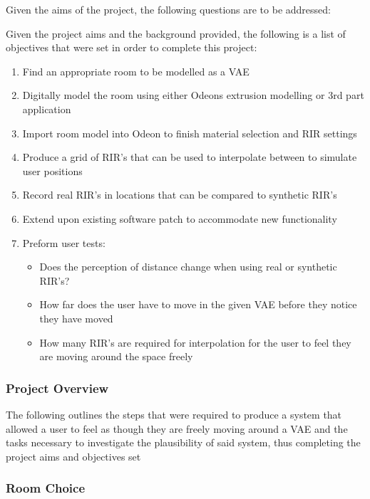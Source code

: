\documentclass[../../main.tex]{subfiles}
\begin{document}
			Given the aims of the project, the following questions are to be addressed:

			Given the project aims and the background provided, the following is a list of objectives that were set in order to complete this project:

			\begin{enumerate}
				\item Find an appropriate room to be modelled as a \ac{VAE} \\
				\item Digitally model the room using either Odeons extrusion modelling or 3rd part application \\
				\item Import room model into Odeon to finish material selection and \ac{RIR} settings\\
				\item Produce a grid of \ac{RIR}'s that can be used to interpolate between to simulate user positions\\
				\item Record real \ac{RIR}'s in locations that can be compared to synthetic \ac{RIR}'s\\
				\item Extend upon existing software patch to accommodate new functionality\\
				\item  Preform user tests:
					\begin{itemize}
						\item Does the perception of distance change when using real or synthetic \ac{RIR}'s?\\
						\item How far does the user have to move in the given \ac{VAE} before they notice they have moved \\
						\item How many \ac{RIR}'s are required for interpolation for the user to feel they are moving around the space freely\\
					\end{itemize}
				\end{enumerate}


		\subsubsection{Project Overview}

			The following outlines the steps that were required to produce a system that allowed a user to feel as though they are freely moving around a \ac{VAE} and the tasks necessary to investigate the plausibility of said system, thus completing the project aims and objectives set

		\subsubsection{Room Choice}

		
\end{document}
